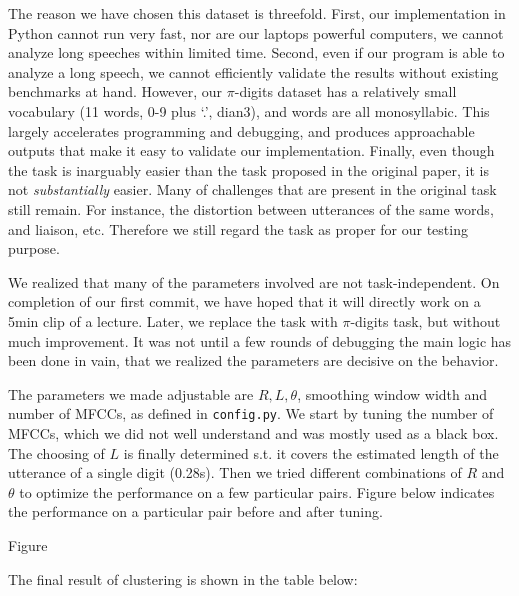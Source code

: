 \documentclass{article}
\begin{document}
    The reason we have chosen this dataset is threefold. First, our implementation in Python cannot run very 
    fast, nor are our laptops powerful computers, we cannot analyze long speeches within limited time. Second,
    even if our program is able to analyze a long speech, we cannot efficiently validate the results
    without existing benchmarks at hand. However, our $\pi$-digits dataset has a relatively small vocabulary
    (11 words, 0-9 plus `.', dian3), and words are all monosyllabic. This largely accelerates programming
    and debugging, and produces approachable outputs that make it easy to validate our implementation.
    Finally, even though the task is inarguably easier than the task proposed in the original paper, it 
    is not \emph{substantially} easier. Many of challenges that are present in the original task still remain.
    For instance, the distortion between utterances of the same words, and liaison, 
    etc. Therefore we still regard the task as proper for our testing purpose.

    We realized that many of the parameters involved are not task-independent. On completion of our first
    commit, we have hoped that it will directly work on a 5min clip of a lecture. Later, we replace the 
    task with $\pi$-digits task, but without much improvement. It was not until a few rounds of debugging 
    the main logic has been done in vain, that we realized the parameters are decisive on the behavior.

    The parameters we made adjustable are $R, L, \theta$, smoothing window width and number of MFCCs, 
    as defined in \texttt{config.py}.
    We start by tuning the number of MFCCs, which we did not well understand and was mostly used as 
    a black box. The choosing of $L$ is finally determined s.t. it covers the estimated length of the utterance 
    of a single digit (0.28s). Then we tried different combinations of $R$ and $\theta$ to optimize 
    the performance on a few particular pairs. Figure below indicates the performance on a particular pair
    before and after tuning.

    Figure

    The final result of clustering is shown in the table below:
\end{document}
